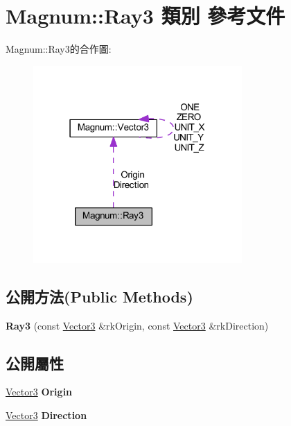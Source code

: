 \hypertarget{class_magnum_1_1_ray3}{}\section{Magnum\+:\+:Ray3 類別 參考文件}
\label{class_magnum_1_1_ray3}


Magnum\+:\+:Ray3的合作圖\+:\nopagebreak
\begin{figure}[H]
\begin{center}
\leavevmode
\includegraphics[width=226pt]{class_magnum_1_1_ray3__coll__graph}
\end{center}
\end{figure}
\subsection*{公開方法(Public Methods)}
\begin{DoxyCompactItemize}
\item 
{\bfseries Ray3} (const \hyperlink{class_magnum_1_1_vector3}{Vector3} \&rk\+Origin, const \hyperlink{class_magnum_1_1_vector3}{Vector3} \&rk\+Direction)\hypertarget{class_magnum_1_1_ray3_a6b85ec094a103857f5a32100f3256710}{}\label{class_magnum_1_1_ray3_a6b85ec094a103857f5a32100f3256710}

\end{DoxyCompactItemize}
\subsection*{公開屬性}
\begin{DoxyCompactItemize}
\item 
\hyperlink{class_magnum_1_1_vector3}{Vector3} {\bfseries Origin}\hypertarget{class_magnum_1_1_ray3_a4f1f6c93e7f3f7f91f95905b67edf548}{}\label{class_magnum_1_1_ray3_a4f1f6c93e7f3f7f91f95905b67edf548}

\item 
\hyperlink{class_magnum_1_1_vector3}{Vector3} {\bfseries Direction}\hypertarget{class_magnum_1_1_ray3_acff627749ee103028415ada92e79b447}{}\label{class_magnum_1_1_ray3_acff627749ee103028415ada92e79b447}

\end{DoxyCompactItemize}


